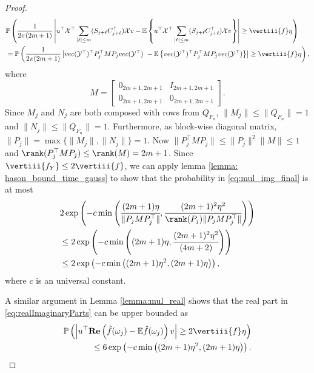 \begin{proof}
\begin{equation}
\label{eq:mul_img_final}
\begin{aligned}
&\mathbb{P}\left(\frac{1}{2\pi(2m+1)}\left|u^\top \mathcal{\mathcal{X}}^\top\sum_{|\ell|\le m}(S_{j+\ell}C_{j+\ell}^\top)\mathcal{\mathcal{X}}  v - \mathbb{E}\left\{u^\top \mathcal{X}^\top\sum_{|\ell|\le m}(S_{j+\ell}C_{j+\ell}^\top)\mathcal{X}  v\right\}\right|\ge \vertiii{f} \eta \right)\\
& = \mathbb{P}\left(\frac{1}{2\pi(2m+1)}\left|vec(\mathcal{Y}^\top)^\top P_j^\top MP_j vec(\mathcal{Y}^\top)\ - \mathbb{E} \left\{vec(\mathcal{Y}^\top)^\top P_j^\top MP_j vec(\mathcal{Y}^\top)\right\}\right|\ge \vertiii{f}\eta\right), 
\end{aligned}
\end{equation}
where 
\begin{equation}
M = \left[
\begin{array}{ll}
0_{2m+1,2m+1} & I_{2m+1,2m+1}\\
0_{2m+1,2m+1} & 0_{2m+1,2m+1}
\end{array}
\right]. 
\end{equation}
Since $M_j$ and $N_j$ are both composed with rows from $Q_{F_n}$, $\|M_j\|\le \|Q_{F_n}\|=1$ and $\|N_j\|\le \|Q_{F_n}\|=1$. Furthermore, as block-wise diagonal matrix, $\|P_j\|=\max\{\|M_j\|, \|N_j\|\}=1$. 
Now $\|P_j^\top M P_j\|\le \|P_j\|^2\|M\| \le 1$ and $\rank(P_j^\top M P_j) \le \rank(M) = 2m+1$. Since $\vertiii{f_Y}\le 2\vertiii{f}$, we can apply lemma \ref{lemma: hason_bound_time_gauss} to show that the probability in \eqref{eq:mul_img_final} is at most 
\begin{equation}
\begin{aligned}
&2\exp\left(-c\min\left(\cfrac{(2m+1)\eta}{\|P_jMP_j^\top\|}, \cfrac{(2m+1)^2\eta^2}{\rank(P_j)\|P_jMP_j^\top\|}\right)\right) \\
&\le 2\exp\left(-c\min\left((2m+1)\eta, \cfrac{(2m+1)^2\eta^2}{(4m+2)}\right)\right) \\
& \le 2\exp\left(-c\min\left((2m+1)\eta^2, (2m+1)\eta\right)\right),
\end{aligned}
\end{equation}
where $c$ is an universal constant. 

A similar argument in Lemma \ref{lemma:mul_real} shows that the real part in \eqref{eq:realImaginaryParts} can be upper bounded as 
\begin{eqnarray}
\mathbb{P}\left(\left|u^\top \mathrm{\bf{Re}}\left(\hat{f}(\omega_j) - \mathbb{E}\hat{f}(\omega_j)\right)v\right|\ge 2 \vertiii{f} \eta \right) \nonumber \\
\le 6\exp \left( - c\min \left((2m+1)\eta^2,(2m+1)\eta \right) \right).
\end{eqnarray}


\end{proof}

